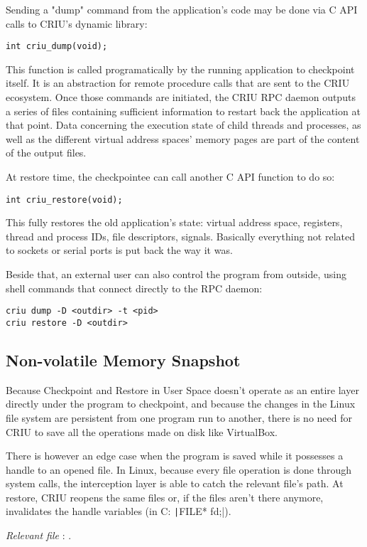 Sending a "dump" command from the application's code may be done via C API calls to CRIU's dynamic library:
\begin{verbatim}
int criu_dump(void);
\end{verbatim}
This function is called programatically by the running application to checkpoint itself. It is an abstraction for remote procedure calls that are sent to the CRIU ecosystem. Once those commands are initiated, the \gls{CRIU} RPC daemon outputs a series of files containing sufficient information to restart back the application at that point. Data concerning the execution state of child threads and processes, as well as the different virtual address spaces' memory pages are part of the content of the output files.

At restore time, the checkpointee can call another C API function to do so: 
\begin{verbatim}
int criu_restore(void);
\end{verbatim}
This fully restores the old application's state: virtual address space, registers, thread and process IDs, file descriptors, signals. Basically everything not related to sockets or serial ports is put back the way it was.

Beside that, an external user can also control the program from outside, using shell commands that connect directly to the RPC daemon:
\begin{verbatim}
criu dump -D <outdir> -t <pid>
criu restore -D <outdir>
\end{verbatim}

\subsection*{Non-volatile Memory Snapshot}
Because Checkpoint and Restore in User Space doesn't operate as an entire layer directly under the program to checkpoint, and because the changes in the Linux file system are persistent from one program run to another, there is no need for CRIU to save all the operations made on disk like VirtualBox. 

There is however an edge case when the program is saved while it possesses a handle to an opened file. In Linux, because every file operation is done through system calls, the interception layer is able to catch the relevant file's path. At restore, CRIU reopens the same files or, if the files aren't there anymore, invalidates the handle variables (in C: \texttt|FILE* fd;|). 

\hfill\textit{Relevant file }: .

